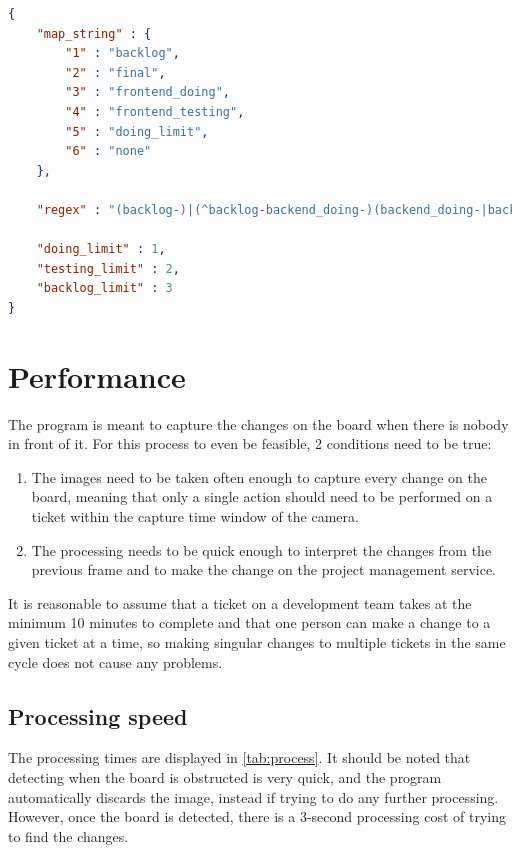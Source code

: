 \documentclass[12pt]{report}
\theoremstyle{definition}
\theoremstyle{remark}
\begin{document}
\newpage
\begin{lstlisting}[language=json,firstnumber=1,caption={Sections.json},captionpos=b]
{
    "map_string" : {
        "1" : "backlog", 
        "2" : "final",
        "3" : "frontend_doing",
        "4" : "frontend_testing",
        "5" : "doing_limit",
        "6" : "none"
    },

    "regex" : "(backlog-)|(^backlog-backend_doing-)(backend_doing-|backend_testing-)*(backend_testing-|backend_testing-final-)?|(^backlog-frontend_doing-)(frontend_doing-|frontend_testing-)*(frontend_testing-|frontend_testing-final-)?",

    "doing_limit" : 1,
    "testing_limit" : 2,
    "backlog_limit" : 3
}
\end{lstlisting}
\label{lis:sections}

\section{Performance}
The program is meant to capture the changes on the board when there is nobody in front of it. For this process to even be feasible, 2 conditions need to be true:

\begin{enumerate}
    \item The images need to be taken often enough to capture every change on the board, meaning that only a single action should need to be performed on a ticket within the capture time window of the camera.
    \item The processing needs to be quick enough to interpret the changes from the previous frame and to make the change on the project management service.
\end{enumerate}

It is reasonable to assume that a ticket on a development team takes at the minimum 10 minutes to complete and that one person can make a change to a given ticket at a time, so making singular changes to multiple tickets in the same cycle does not cause any problems. 

\subsection{Processing speed}
The processing times are displayed in \autoref{tab:process}. It should be noted that detecting when the board is obstructed is very quick, and the program automatically discards the image, instead if trying to do any further processing. However, once the board is detected, there is a 3-second processing cost of trying to find the changes.
\end{document}

